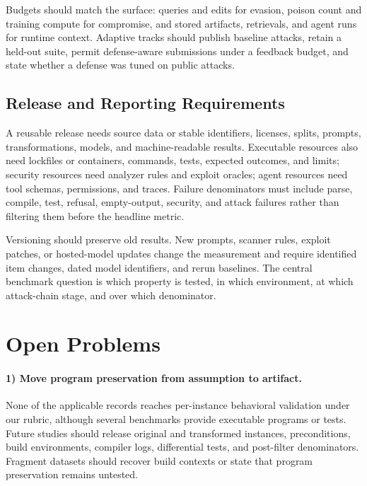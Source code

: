 \documentclass[acmsmall,screen,review]{acmart}
\begin{document}
Budgets should match the surface: queries and edits for evasion, poison count and training compute for compromise, and stored artifacts, retrievals, and agent runs for runtime context. Adaptive tracks should publish baseline attacks, retain a held-out suite, permit defense-aware submissions under a feedback budget, and state whether a defense was tuned on public attacks.

\subsection{Release and Reporting Requirements}
A reusable release needs source data or stable identifiers, licenses, splits, prompts, transformations, models, and machine-readable results. Executable resources also need lockfiles or containers, commands, tests, expected outcomes, and limits; security resources need analyzer rules and exploit oracles; agent resources need tool schemas, permissions, and traces. Failure denominators must include parse, compile, test, refusal, empty-output, security, and attack failures rather than filtering them before the headline metric.

Versioning should preserve old results. New prompts, scanner rules, exploit patches, or hosted-model updates change the measurement and require identified item changes, dated model identifiers, and rerun baselines. The central benchmark question is which property is tested, in which environment, at which attack-chain stage, and over which denominator.

\section{Open Problems} \label{sec:open}

\paragraph{1) Move program preservation from assumption to artifact.} None of the applicable records reaches per-instance behavioral validation under our rubric, although several benchmarks provide executable programs or tests. Future studies should release original and transformed instances, preconditions, build environments, compiler logs, differential tests, and post-filter denominators. Fragment datasets should recover build contexts or state that program preservation remains untested.
\end{document}
